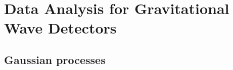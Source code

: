 \documentclass[openleft]{kentigern}
\theoremstyle{definition}
\begin{document}

% 

% 

% 

\part{Data Analysis for Gravitational Wave Detectors}
\label{part:data-analysis}

\chapter{Gaussian processes}
\label{cha:gaussian-process}
\chapterprecis{}






\end{document}
